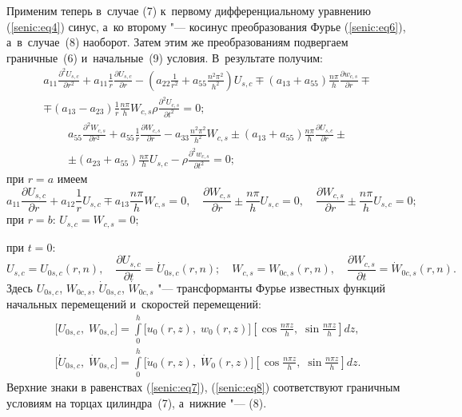 Применим теперь в~случае (7) к~первому дифференциальному уравнению (\ref{senic:eq4}) 
синус, а~ко второму "--- косинус преобразования Фурье (\ref{senic:eq6}), а~в~случае~(8) 
наоборот. Затем этим же преобразованиям подвергаем граничные~(6) и~начальные~(9) условия. 
В~результате получим:
\begin{multline*}
a_{11} \frac{\partial ^2U_{s,c} }{\partial r^2} + a_{11} 
\frac{1}{r}\frac{\partial U_{s,c} }{\partial r} - \left( {a_{22} 
\frac{1}{r^2} + a_{55} \frac{n^2\pi ^2}{h^2}} \right)U_{s,c} \mp \left( 
{a_{13} + a_{55} } \right)\frac{n\pi }{h}\frac{\partial w_{c,s} }{\partial 
r} \mp \\
 \mp \left( {a_{13} - a_{23} } \right)\frac{1}{r}\frac{n\pi }{h}W_{c,s} \rho 
\frac{\partial ^2U_{c,s} }{\partial t^2} = 0; 
\end{multline*}
\begin{multline}
 \label{senic:eq7}
a_{55} \frac{\partial ^2W_{c,s} }{\partial r^2} + a_{55} 
\frac{1}{r}\frac{\partial W_{c,s} }{\partial r} - a_{33} \frac{n^2\pi 
^2}{h^2}W_{c,s} \pm \left( {a_{13} + a_{55} } \right)\frac{n\pi 
}{h}\frac{\partial U_{s,c} }{\partial r}\pm 
\\
\pm \left( {a_{23} + a_{55} } \right)\frac{n\pi }{h}U_{s,c} - \rho 
\frac{\partial ^2w_{c,s} }{\partial t^2} = 0;
\end{multline}
при $r = a$ имеем
\begin{equation}
\label{senic:eq8}
a_{11} \frac{\partial U_{s,c} }{\partial r} + a_{12} \frac{1}{r}U_{s,c} \mp a_{13} \frac{n\pi }{h}W_{c,s} = 0,
\quad 
\frac{\partial W_{c,s} }{\partial r}\pm \frac{n\pi }{h}U_{s,c} = 0,\quad 
\frac{\partial W_{c,s} }{\partial r}\pm \frac{n\pi }{h}U_{s,c} = 0;
\end{equation}
при $r = b$: $U_{s,c} = W_{c,s} = 0;$

при $t = 0$:
\begin{equation}
\label{senic:eq9}
U_{s,c} = U_{0s,c} \left( {r,n} \right),\quad 
 \frac{\partial U_{s,c} }{\partial t} = \dot U_{0s,c} \left( {r,n} \right);\quad
W_{c,s} = W_{0c,s} \left( {r,n} \right),\quad 
\frac{\partial W_{c,s} }{\partial t} = \dot W_{0c,s} \left( {r,n} \right).
\end{equation}
Здесь $U_{0s,c}$, $W_{0c,s}$, $\dot U_{0s,c}$, $\dot W_{0c,s} $ "---  трансформанты  Фурье известных 
функций начальных перемещений и~скоростей перемещений:
\begin{equation}
\label{senic:eq10}
\begin{array}{c}
\displaystyle
\Big[ {U_{0s,c},\; W_{0s,c} } \Big] = 
\int\limits_0^h {\Big[ {u_0 \left( {r, z} \right),\; w_0 \left( {r, z} \right)} \Big]} \left[ {\cos \frac{n\pi 
z}{h},\; \sin \frac{n\pi z}{h}} \right]dz,\\ \displaystyle
\Big[ \dot U_{0s,c},\; \dot W_{0s,c}  
\Big] = \int\limits_0^h \Big[ \dot u_0 \left( {r,z}\right),\;
\dot W_0 \left( {r,z} \right) \Big] \left[ {\cos \frac{n\pi z}{h},\;\sin \frac{n\pi z}{h}} \right]dz.
\end{array}
\end{equation}
Верхние знаки в равенствах (\ref{senic:eq7}), (\ref{senic:eq8}) соответствуют граничным условиям на 
торцах цилиндра~(7), а~нижние "--- (8).

